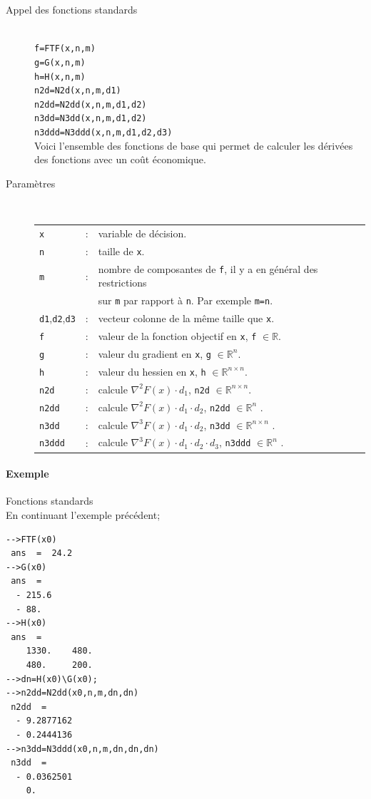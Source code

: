 \begin{description}
  \item[Appel des fonctions standards] \hfill \\
{\tt f=FTF(x,n,m)}\\
{\tt g=G(x,n,m)}\\
{\tt h=H(x,n,m)}\\
{\tt n2d=N2d(x,n,m,d1)}\\
{\tt n2dd=N2dd(x,n,m,d1,d2)}\\
{\tt n3dd=N3dd(x,n,m,d1,d2)}\\
{\tt n3ddd=N3ddd(x,n,m,d1,d2,d3)}\\
Voici l'ensemble des fonctions de base qui permet de calculer les dérivées des fonctions avec 
un coût économique.
  \item[Paramètres] \hfill \\
\begin{tabular}{lll}
{\tt x}&:&variable de décision.\\
{\tt n}&:&taille de {\tt x}.\\
{\tt m}&:&nombre de composantes de {\tt f}, il y a en général des restrictions\\
&& sur {\tt m} par rapport à {\tt n}. Par exemple {\tt m=n}.\\
{\tt d1},{\tt d2},{\tt d3}&:&vecteur colonne de la même taille que {\tt x}.\\
{\tt f}& :& valeur de la fonction objectif en {\tt x}, {\tt f} $\in \mathbb{R}$.\\
{\tt g}& :& valeur du gradient en {\tt x}, {\tt g} $\in \mathbb{R}^n$.\\
{\tt h}& :& valeur du hessien en {\tt x}, {\tt h} $\in \mathbb{R}^{n\times n}$.\\
{\tt n2d}&:& calcule $\nabla^2 F(x)\cdot d_1$, {\tt n2d} $\in \mathbb{R}^{n\times n}$. \\
{\tt n2dd}&:& calcule $\nabla^2 F(x)\cdot d_1\cdot d_2 $, {\tt n2dd} $\in \mathbb{R}^{n}$ .\\
{\tt n3dd}&:& calcule $\nabla^3 F(x)\cdot d_1\cdot d_2 $, {\tt n3dd} $\in \mathbb{R}^{n\times n}$ .\\
{\tt n3ddd}&:& calcule $\nabla^3 F(x)\cdot d_1\cdot d_2 \cdot d_3$, {\tt n3ddd} $\in \mathbb{R}^{n}$ .\\
\end{tabular}
\end{description}



\paragraph{Exemple}{}Fonctions standards \\
En continuant l'exemple précédent;
\begin{verbatim} 
-->FTF(x0)
 ans  =  24.2 
-->G(x0) 
 ans  =
  - 215.6 
  - 88.
-->H(x0)
 ans  =
    1330.    480. 
    480.     200. 
-->dn=H(x0)\G(x0);
-->n2dd=N2dd(x0,n,m,dn,dn)
 n2dd  =
  - 9.2877162  
  - 0.2444136
-->n3dd=N3ddd(x0,n,m,dn,dn,dn)
 n3dd  =
  - 0.0362501  
    0.  
\end{verbatim}

